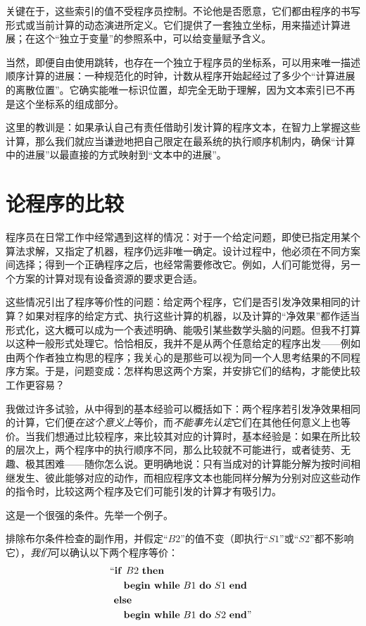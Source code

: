 \documentclass[twoside,11pt,fontset=none]{ctexbook}
\begin{document}
关键在于，这些索引的值不受程序员控制。不论他是否愿意，它们都由程序的书写形式或当前计算的动态演进所定义。它们提供了一套独立坐标，用来描述计算进展；在这个“独立于变量”的参照系中，可以给变量赋予含义。

当然，即便自由使用跳转，也存在一个独立于程序员的坐标系，可以用来唯一描述顺序计算的进展：一种规范化的时钟，计数从程序开始起经过了多少个“计算进展的离散位置”。它确实能唯一标识位置，却完全无助于理解，因为文本索引已不再是这个坐标系的组成部分。

这里的教训是：如果承认自己有责任借助引发计算的程序文本，在智力上掌握这些计算，那么我们就应当谦逊地把自己限定在最系统的执行顺序机制内，确保“计算中的进展”以最直接的方式映射到“文本中的进展”。

\section[论程序的比较]{论程序的比较}
\label{sec:comparing-programs}

程序员在日常工作中经常遇到这样的情况：对于一个给定问题，即使已指定用某个算法求解，又指定了机器，程序仍远非唯一确定。设计过程中，他必须在不同方案间选择；得到一个正确程序之后，也经常需要修改它。例如，人们可能觉得，另一个方案的计算对现有设备资源的要求更合适。

这些情况引出了程序等价性的问题：给定两个程序，它们是否引发净效果相同的计算？如果对程序的给定方式、执行这些计算的机器，以及计算的“净效果”都作适当形式化，这大概可以成为一个表述明确、能吸引某些数学头脑的问题。但我不打算以这种一般形式处理它。恰恰相反，我并不是从两个任意给定的程序出发——例如由两个作者独立构思的程序；我关心的是那些可以视为同一个人思考结果的不同程序方案。于是，问题变成：怎样构思这两个方案，并安排它们的结构，才能使比较工作更容易？

我做过许多试验，从中得到的基本经验可以概括如下：两个程序若引发净效果相同的计算，它们便\textit{在这个意义上}等价，而\textit{不能事先认定}它们在其他任何意义上也等价。当我们想通过比较程序，来比较其对应的计算时，基本经验是：如果在所比较的层次上，两个程序中的执行顺序不同，那么比较就不可能进行，或者徒劳、无趣、极其困难——随你怎么说。更明确地说：只有当成对的计算能分解为按时间相继发生、彼此能够对应的动作，而相应程序文本也能同样分解为分别对应这些动作的指令时，比较这两个程序及它们可能引发的计算才有吸引力。

这是一个很强的条件。先举一个例子。

排除布尔条件检查的副作用，并假定“$B2$”的值不变（即执行“$S1$”或“$S2$”都不影响它），\textit{我们}可以确认以下两个程序等价：
\begin{equation}
	\label{eq:comparing-example-1}
	\begin{split}
	&\text{\hspace{-.4em}``\textbf{if }} B2\text{ \textbf{then}}\\
	&\quad \text{\textbf{begin while} } B1\text{ \textbf{do} } S1 \text{ \textbf{end}}\\
	&\text{\textbf{else}}\\
	&\quad \text{\textbf{begin while} } B1\text{ \textbf{do} } S2\text{ \textbf{end}''}
	\end{split}
\end{equation}
\end{document}
